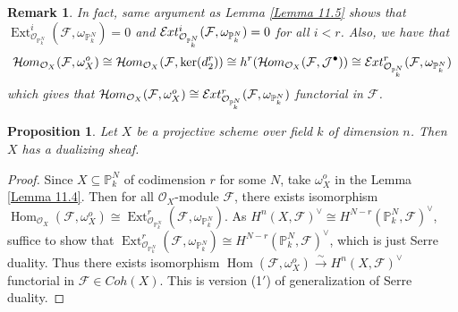 \documentclass{ctexart}
\newtheorem{remark}{Remark}[section]
\newtheorem{proposition}{Proposition}[section]
\renewcommand{\hom}{\operatorname{Hom}}
\newcommand{\ext}{\operatorname{Ext}}
\newcommand{\sheafhom}{\mathcal{H}\kern -.5pt om}
\newcommand{\sheafext}{\mathcal{E}\kern -.5pt xt}
\begin{document}
\begin{remark}
    In fact, same argument as Lemma \ref{Lemma 11.5} shows that $\ext_{\mathcal{O}_{\mathbb{P}_{k}^{N}}}^{i}(\mathcal{F}, \omega_{\mathbb{P}_{k}^{N}}) = 0$ and $\sheafext_{\mathcal{O}_{\mathbb{P}_{k}^{N}}}^{i}(\mathcal{F}, \omega_{\mathbb{P}_{k}^{N}}) = 0$ for all $i < r$.
    Also, we have that 
    \begin{equation*}
        \sheafhom_{\mathcal{O}_{X}}(\mathcal{F}, \omega_{X}^{o}) \cong \sheafhom_{\mathcal{O}_{X}}(\mathcal{F}, \ker(d_{2}^{r})) \cong h^{r}(\sheafhom_{\mathcal{O}_{X}}(\mathcal{F}, \mathcal{J}^{\bullet})) \cong \sheafext_{\mathcal{O}_{\mathbb{P}_{k}^{N}}}^{r}(\mathcal{F}, \omega_{\mathbb{P}_{k}^{N}})
    \end{equation*}
    which gives that $\sheafhom_{\mathcal{O}_{X}}(\mathcal{F}, \omega_{X}^{o}) \cong \sheafext_{\mathcal{O}_{\mathbb{P}_{k}^{N}}}^{r}(\mathcal{F}, \omega_{\mathbb{P}_{k}^{N}})$ functorial in $\mathcal{F}$.
\end{remark}
\begin{proposition}
    Let $X$ be a projective scheme over field $k$ of dimension $n$.
    Then $X$ has a dualizing sheaf.
    \label{Proposition 11.9}
\end{proposition}
\begin{proof}
    Since $X \subseteq \mathbb{P}_{k}^{N}$ of codimension $r$ for some $N$, take $\omega_{X}^{o}$ in the Lemma \ref{Lemma 11.4}.
    Then for all $\mathcal{O}_{X}$-module $\mathcal{F}$, there exists isomorphism $\hom_{\mathcal{O}_{X}}(\mathcal{F}, \omega_{X}^{o}) \cong \ext_{\mathcal{O}_{\mathbb{P}_{k}^{N}}}^{r}(\mathcal{F}, \omega_{\mathbb{P}_{k}^{N}})$.
    As $H^{n}(X, \mathcal{F})^{\lor} \cong H^{N - r}(\mathbb{P}_{k}^{N}, \mathcal{F})^{\lor}$, suffice to show that $\ext_{\mathcal{O}_{\mathbb{P}_{k}^{N}}}^{r}(\mathcal{F}, \omega_{\mathbb{P}_{k}^{N}}) \cong H^{N - r}(\mathbb{P}_{k}^{N}, \mathcal{F})^{\lor}$, which is just Serre duality.
    Thus there exists isomorphism $\hom(\mathcal{F}, \omega_{X}^{o}) \overset{\sim}{\longrightarrow} H^{n}(X, \mathcal{F})^{\lor}$ functorial in $\mathcal{F}\in Coh(X)$.
    This is version (1$'$) of generalization of Serre duality.
\end{proof}
\end{document}
